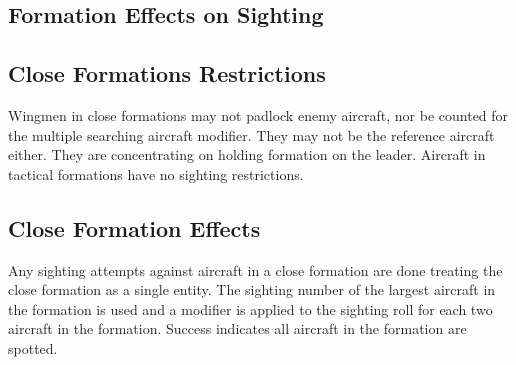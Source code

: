 \begin{advancedrules}
    \section{Formation Effects on Sighting}

    \subsection{Close Formations Restrictions} Wingmen in close formations may not padlock enemy aircraft, nor be counted for the multiple searching aircraft modifier. They may not be the reference aircraft either. They are concentrating on holding formation on the leader. Aircraft in tactical formations have no sighting restrictions.

    \subsection{Close Formation Effects} Any sighting attempts against aircraft in a close formation are done treating the close formation as a single entity. The sighting number of the largest aircraft in the formation is used and a  modifier is applied to the sighting roll for each two aircraft in the formation. Success indicates all aircraft in the formation are spotted.

\end{advancedrules}
